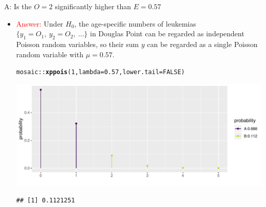 \documentclass[handout]{beamer}\usepackage[]{graphicx}\usepackage[]{color}
\newcommand{\hlnum}[1]{\textcolor[rgb]{0.686,0.059,0.569}{#1}}%
\newcommand{\hlopt}[1]{\textcolor[rgb]{0,0,0}{#1}}%
\newcommand{\hlstd}[1]{\textcolor[rgb]{0.345,0.345,0.345}{#1}}%
\newcommand{\hlkwc}[1]{\textcolor[rgb]{0.333,0.667,0.333}{#1}}%
\newcommand{\hlkwd}[1]{\textcolor[rgb]{0.737,0.353,0.396}{\textbf{#1}}}%
\newenvironment{knitrout}{}{} %
\newcommand{\red}[1]{\textcolor{red}{#1}}
\begin{document}
\begin{frame}[fragile]{A: Is the $O=2$ significantly higher than $E=0.57$}
\small
\begin{itemize}
\setlength\itemsep{1.2em}
\item \red{Answer:} Under  $H_{0}$, the age-specific numbers of leukemias $\{y_{1}=O_{1},\: y_{2}=O_{2},\: \dots \}$ in Douglas Point can be regarded as independent Poisson random variables, so their sum $y$ can be regarded as a single Poisson random variable with $\mu=0.57$. 

\begin{knitrout}\scriptsize
{}\color{fgcolor}
\begin{alltt}
\hlstd{mosaic}\hlopt{::}\hlkwd{xppois}\hlstd{(}\hlnum{1}\hlstd{,} \hlkwc{lambda} \hlstd{=} \hlnum{0.57}\hlstd{,} \hlkwc{lower.tail} \hlstd{=} \hlnum{FALSE}\hlstd{)}
\end{alltt}


{\centering \includegraphics[width=1\linewidth]{figure/unnamed-chunk-19-1} 

}


\begin{verbatim}
## [1] 0.1121251
\end{verbatim}

\end{knitrout}


\end{itemize}

\end{frame}
\end{document}
